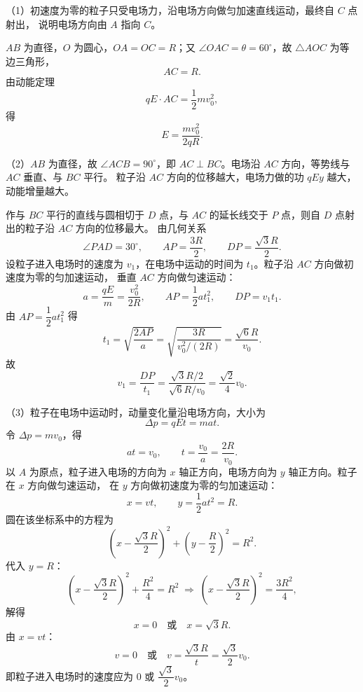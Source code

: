 \begin{answer}
（1）初速度为零的粒子只受电场力，沿电场方向做匀加速直线运动，最终自 $C$ 点射出，
说明电场方向由 $A$ 指向 $C$。

$AB$ 为直径，$O$ 为圆心，$OA=OC=R$；又 $\angle OAC=\theta=60^{\circ}$，故 $\triangle AOC$ 为等边三角形，
\[
  AC=R.
\]
由动能定理
\[
  qE\cdot AC=\frac{1}{2}mv_0^{2},
\]
得
\[
  E=\frac{mv_0^{2}}{2qR}.
\]

（2）$AB$ 为直径，故 $\angle ACB=90^{\circ}$，即 $AC\perp BC$。电场沿 $AC$ 方向，等势线与 $AC$ 垂直、与 $BC$ 平行。
粒子沿 $AC$ 方向的位移越大，电场力做的功 $qEy$ 越大，动能增量越大。

作与 $BC$ 平行的直线与圆相切于 $D$ 点，与 $AC$ 的延长线交于 $P$ 点，则自 $D$ 点射出的粒子沿 $AC$ 方向的位移最大。
由几何关系
\[
  \angle PAD=30^{\circ},\qquad AP=\frac{3R}{2},\qquad DP=\frac{\sqrt{3}R}{2}.
\]
设粒子进入电场时的速度为 $v_1$，在电场中运动的时间为 $t_1$。粒子沿 $AC$ 方向做初速度为零的匀加速运动，
垂直 $AC$ 方向做匀速运动：
\[
  a=\frac{qE}{m}=\frac{v_0^{2}}{2R},\qquad
  AP=\frac{1}{2}at_1^{2},\qquad DP=v_1t_1.
\]
由 $AP=\dfrac{1}{2}at_1^{2}$ 得
\[
  t_1=\sqrt{\frac{2AP}{a}}
     =\sqrt{\frac{3R}{v_0^{2}/(2R)}}
     =\frac{\sqrt{6}R}{v_0}.
\]
故
\[
  v_1=\frac{DP}{t_1}
     =\frac{\sqrt{3}R/2}{\sqrt{6}R/v_0}
     =\frac{\sqrt{2}}{4}v_0.
\]

（3）粒子在电场中运动时，动量变化量沿电场方向，大小为
\[
  \Delta p=qEt=mat.
\]
令 $\Delta p=mv_0$，得
\[
  at=v_0,\qquad t=\frac{v_0}{a}=\frac{2R}{v_0}.
\]
以 $A$ 为原点，粒子进入电场的方向为 $x$ 轴正方向，电场方向为 $y$ 轴正方向。粒子在 $x$ 方向做匀速运动，
在 $y$ 方向做初速度为零的匀加速运动：
\[
  x=vt,\qquad y=\frac{1}{2}at^{2}=R.
\]
圆在该坐标系中的方程为
\[
  \left(x-\frac{\sqrt{3}R}{2}\right)^{2}+\left(y-\frac{R}{2}\right)^{2}=R^{2}.
\]
代入 $y=R$：
\[
  \left(x-\frac{\sqrt{3}R}{2}\right)^{2}+\frac{R^{2}}{4}=R^{2}
  \;\Longrightarrow\;
  \left(x-\frac{\sqrt{3}R}{2}\right)^{2}=\frac{3R^{2}}{4},
\]
解得
\[
  x=0\quad\text{或}\quad x=\sqrt{3}R.
\]
由 $x=vt$：
\[
  v=0\quad\text{或}\quad v=\frac{\sqrt{3}R}{t}=\frac{\sqrt{3}}{2}v_0.
\]
即粒子进入电场时的速度应为 $0$ 或 $\dfrac{\sqrt{3}}{2}v_0$。
\end{answer}

